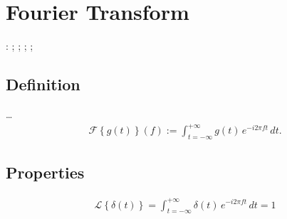 \documentclass[letterpaper,10pt,english]{jupyterBook}
\begin{document}
\section{Fourier Transform}
\label{\detokenize{ch/complex/fourier-transform:fourier-transform}}\label{\detokenize{ch/complex/fourier-transform:complex-fourier-transform}}\label{\detokenize{ch/complex/fourier-transform::doc}}
\sphinxAtStartPar
{}: {\hyperref[\detokenize{ch/complex/fourier-transform:complex-fourier-transform-def}]{}}; {\hyperref[\detokenize{ch/complex/fourier-transform:complex-fourier-transform-properties}]{}}; {\hyperref[\detokenize{ch/complex/fourier-transform:complex-fourier-transform-inverse}]{}}; {\hyperref[\detokenize{ch/complex/fourier-transform:complex-fourier-transform-plancherel}]{}}; {\hyperref[\detokenize{ch/complex/fourier-transform:complex-fourier-transform-uncertainty}]{}}


\subsection{Definition}
\label{\detokenize{ch/complex/fourier-transform:definition}}\label{\detokenize{ch/complex/fourier-transform:complex-fourier-transform-def}}
\sphinxAtStartPar
…
\begin{equation*}
\begin{split}\mathscr{F}\left\{ g(t) \right\}(f) := \int_{t = -\infty}^{+\infty} g(t) \, e^{-i 2 \pi f t} \, dt .\end{split}
\end{equation*}

\subsection{Properties}
\label{\detokenize{ch/complex/fourier-transform:properties}}\label{\detokenize{ch/complex/fourier-transform:complex-fourier-transform-properties}}
\sphinxAtStartPar
{}

\sphinxAtStartPar
{}
\begin{equation}\label{equation:ch/complex/fourier-transform:eq:complex:fourier:transform:properties:delta}
\begin{split}\mathscr{L}\left\{ \delta(t) \right\} = \int_{t=-\infty}^{+\infty} \delta(t) \, e^{-i 2 \pi f t} \, dt = 1 \end{split}
\end{equation}
\sphinxAtStartPar
{}
\end{document}
